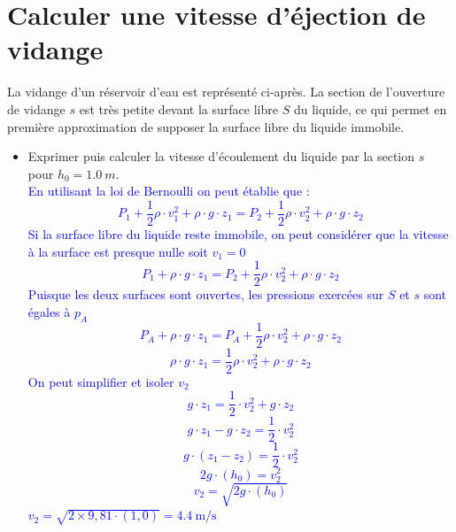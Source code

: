 \documentclass[a4paper,11pt,fleqn,usenames,dvipsnames]{article}%
\begin{document}
\section{Calculer une vitesse d'éjection de vidange}
La vidange d'un réservoir d'eau est représenté ci-après. La section de l'ouverture de vidange $s$ est très petite devant la surface libre $S$ du liquide, ce qui permet en première approximation de supposer la surface libre du liquide immobile.
\begin{itemize}
	\item Exprimer puis calculer la vitesse d'écoulement du liquide par la section $s$ pour $h_0=\SI{1,0}{m}$.\\
	\textcolor{blue}{En utilisant la loi de Bernoulli on peut établie que :
	$$ P_1 + \dfrac{1}{2} \rho \cdot v_1^2 + \rho\cdot g \cdot z_1 = P_2 + \dfrac{1}{2} \rho \cdot v_2^2 + \rho\cdot g \cdot z_2 $$
	Si la surface libre du liquide reste immobile, on peut considérer que la vitesse à la surface est presque nulle soit $v_1=0$
	$$ P_1 + \rho\cdot g \cdot z_1 = P_2 + \dfrac{1}{2} \rho \cdot v_2^2 + \rho\cdot g \cdot z_2 $$
	Puisque les deux surfaces sont ouvertes, les pressions exercées sur $S$ et $s$ sont égales à $p_A$
	$$ P_A + \rho\cdot g \cdot z_1 = P_A + \dfrac{1}{2} \rho \cdot v_2^2 + \rho\cdot g \cdot z_2 $$
	$$ \rho\cdot g \cdot z_1 = \dfrac{1}{2} \rho \cdot v_2^2 + \rho\cdot g \cdot z_2 $$
	On peut simplifier et isoler $v_2$
	$$ g \cdot z_1 = \dfrac{1}{2} \cdot v_2^2 + g \cdot z_2 $$
	$$ g \cdot z_1 - g \cdot z_2= \dfrac{1}{2} \cdot v_2^2$$
	$$ g \cdot (z_1 - z_2) = \dfrac{1}{2} \cdot v_2^2$$
	$$ 2g \cdot (h_0) = v_2^2$$
	$$v_2 = \sqrt{2g \cdot (h_0)}$$
	 $v_2 = \sqrt{2\times 9,81 \cdot (1,0)} =\SI{4,4}{\meter\per\second}$
	}
\end{itemize}
\begin{center}
\end{center}
\end{document}
